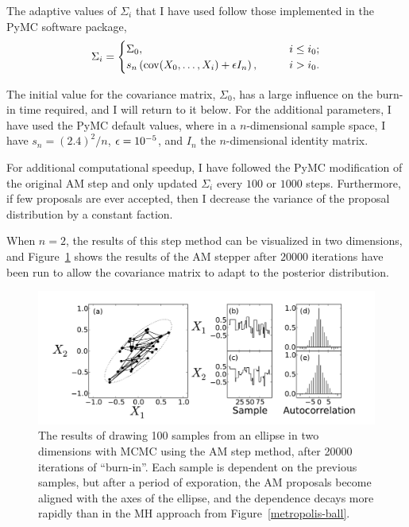 The adaptive values of $\Sigma_i$ that I have used follow those
implemented in the PyMC software package,\cite{Patil_PyMC_2010}
\[
\Sigma_i = \begin{cases}
\Sigma_0, &\qquad i \leq i_0;\\
s_n \left(\operatorname{cov}(X_0, \ldots, X_i) + \epsilon I_n\right), &\qquad i > i_0.
\end{cases}
\]

The initial value for the covariance matrix, $\Sigma_0$, has a large
influence on the burn-in time required, and I will return to it below.
For the additional parameters, I have used the PyMC default values,
where in a $n$-dimensional sample space, I have $s_n = (2.4)^2/n$, $\epsilon
= 10^{-5}$, and $I_n$ the $n$-dimensional identity matrix.

For additional computational speedup, I have followed the PyMC
modification of the original AM step and only updated $\Sigma_i$ every
$100$ or $1000$ steps.  Furthermore, if few proposals are
ever accepted, then I decrease the variance of the
proposal distribution by a constant faction.

When $n=2$, the results of this step method can be visualized in two
dimensions, and Figure~\ref{am-ball} shows the results of the AM
stepper after $20000$ iterations have been run to allow the covariance
matrix to adapt to the posterior distribution.

\begin{figure}[ht]
\begin{center}
\includegraphics[width=\textwidth]{am-ball-2.pdf}
\caption{The results of drawing 100 samples from an ellipse in two
  dimensions with MCMC using the AM step method, after 20000
  iterations of ``burn-in''.  Each sample is dependent on the previous
  samples, but after a period of exporation, the AM proposals become
  aligned with the axes of the ellipse, and the dependence decays more
  rapidly than in the MH approach from Figure~\ref{metropolis-ball}.}
\label{am-ball}
\end{center}
\end{figure}


